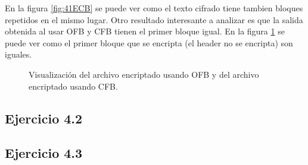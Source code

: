 \documentclass[a4paper,10pt]{article}
\begin{document}
En la figura \ref{fig:41ECB} se puede ver como el texto cifrado tiene tambien bloques
repetidos en el mismo lugar. Otro resultado interesante a analizar es que la salida obtenida al usar
OFB y CFB tienen el primer bloque igual. En la figura \ref{fig:41OFBCFB} se puede ver
como el primer bloque que se encripta (el header no se encripta) son iguales.
\begin{figure}
	\begin{center}
	\end{center}
	\caption{Visualización del archivo encriptado usando OFB y del archivo encriptado usando CFB.}
	\label{fig:41OFBCFB}
\end{figure}

\subsection{Ejercicio 4.2}

\subsection{Ejercicio 4.3}
\end{document}
